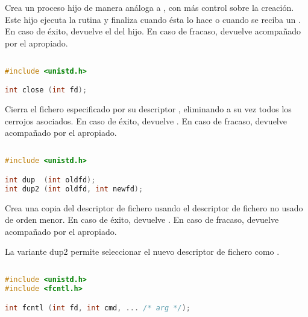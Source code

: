 Crea un proceso hijo de manera análoga a , con más control sobre la creación.
Este hijo ejecuta la rutina  y finaliza cuando ésta lo hace o cuando se reciba un .
En caso de éxito, devuelve el  del hijo.
En caso de fracaso, devuelve  acompañado por el  apropiado.

\pagebreak

\subsection{}\label{close}

\begin{lstlisting}[language=C]
#include <unistd.h>

int close (int fd);
\end{lstlisting}

Cierra el fichero especificado por su descriptor , eliminando a su vez todos los cerrojos asociados.
En caso de éxito, devuelve .
En caso de fracaso, devuelve  acompañado por el  apropiado.

\subsection{}\label{dup}

\begin{lstlisting}[language=C]
#include <unistd.h>

int dup  (int oldfd);
int dup2 (int oldfd, int newfd);
\end{lstlisting}

Crea una copia del descriptor de fichero  usando el descriptor de fichero no usado de orden menor.
En caso de éxito, devuelve .
En caso de fracaso, devuelve  acompañado por el  apropiado.

La variante dup2 permite seleccionar el nuevo descriptor de fichero como .

\subsection{}\label{fcntl}

\begin{lstlisting}[language=C]
#include <unistd.h>
#include <fcntl.h>

int fcntl (int fd, int cmd, ... /* arg */);
\end{lstlisting}

